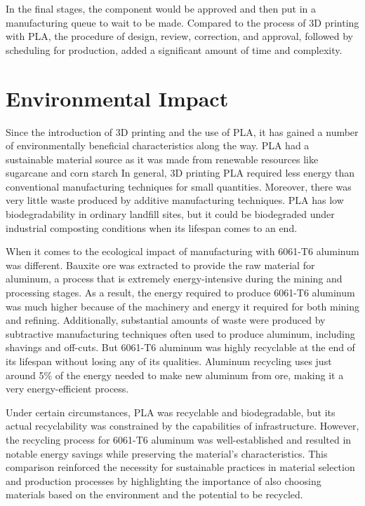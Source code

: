     In the final stages, the component would be approved and then put in a manufacturing queue to wait to
    be made. Compared to the process of 3D printing with PLA, the procedure of design, review, correction,
    and approval, followed by scheduling for production, added a significant amount of time and complexity.

\section{Environmental Impact}

    Since the introduction of 3D printing and the use of PLA, it has gained a number of environmentally
    beneficial characteristics along the way. PLA had a sustainable material source as it was made from
    renewable resources like sugarcane and corn starch In
    general, 3D printing PLA required less energy than conventional manufacturing techniques for small
    quantities. Moreover, there was very little waste produced by additive manufacturing techniques. PLA has
    low biodegradability in ordinary landfill sites, but it could be biodegraded under industrial composting
    conditions when its lifespan comes to an end\cite{pla_environmental_impact1}\cite{pla_environmental_impact2}.

    When it comes to the ecological impact of manufacturing with 6061-T6 aluminum was different. Bauxite ore
    was extracted to provide the raw material for aluminum, a process that is extremely energy-intensive
    during the mining and processing stages. As a result, the energy required to produce 6061-T6 aluminum
    was much higher because of the machinery and energy it required for both mining and refining.
    Additionally, substantial amounts of waste were produced by subtractive manufacturing techniques often
    used to produce aluminum, including shavings and off-cuts. But 6061-T6 aluminum was highly
    recyclable at the end of its lifespan without losing any of its qualities. Aluminum recycling uses just
    around 5\% of the energy needed to make new aluminum from ore, making it a very energy-efficient
    process\cite{aluminium_environmental_impact1}\cite{aluminium_environmental_impact2}.

    Under certain circumstances, PLA was recyclable and biodegradable, but its actual recyclability was
    constrained by the capabilities of infrastructure. However, the recycling process for 6061-T6 aluminum
    was well-established and resulted in notable energy savings while preserving the material's
    characteristics. This comparison reinforced the necessity for sustainable practices in material selection
    and production processes by highlighting the importance of also choosing materials based on the
    environment and the potential to be recycled.